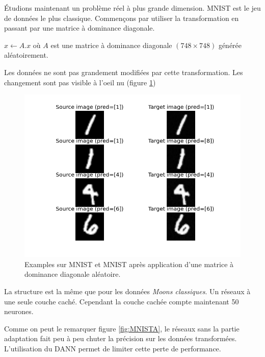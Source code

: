 Étudions maintenant un problème réel à plus grande dimension.
MNIST est le jeu de données le plus classique. Commençons par utiliser la 
transformation en passant par une matrice à dominance diagonale.

$ x \gets A.x $ où $A$ est une matrice à dominance diagonale $(748\times748)$
générée aléatoirement.

Les données ne sont pas grandement modifiées par cette transformation. 
Les changement sont pas visible à l'oeil nu (figure \ref{fig:MNIST-A-sample})

\begin{figure}[htbp]
\centering
\includegraphics[width=\columnwidth]{fig/MNIST-A-sample.png}
\caption{Examples sur MNIST et MNIST après application d'une matrice à dominance diagonale aléatoire.}
\label{fig:MNIST-A-sample}
\end{figure}

La structure est la même que pour les données \emph{Moons classiques}. 
Un réseaux à une seule couche caché. Cependant la couche cachée compte
maintenant 50 neurones.

Comme on peut le remarquer figure \ref{fig:MNISTA}, le réseaux sans la partie
adaptation fait peu à peu chuter la précision sur les données transformées.
L'utilisation du DANN permet de limiter cette perte de performance.

